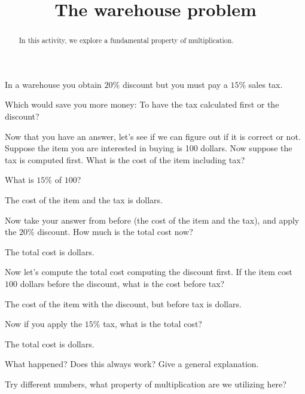 \documentclass{ximera}
\title{The warehouse problem}
\begin{document}
\begin{abstract}
In this activity, we explore a fundamental property of multiplication. 
\end{abstract}
\maketitle

\begin{question}
In a warehouse you obtain $20\%$ discount but you must pay a $15\%$
sales tax. 


 Which would save you more money: To have the tax calculated
  first or the discount?
\begin{solution}
\begin{multiple-choice}
\end{multiple-choice}
\end{solution}
Now that you have an answer, let's see if we can figure out if it is
correct or not. Suppose the item you are interested in buying is 100
dollars. Now suppose the tax is computed first. What is the cost of
the item including tax?
\begin{solution}
\begin{hint}
What is $15\%$ of $100$?  
\end{hint}
The cost of the item and the tax is
 dollars. 
\end{solution}
 Now take your answer from before (the cost of the item and the tax),
and apply the $20\%$ discount. How much is the total cost now?
\begin{solution}
The total cost is  dollars. 
\end{solution}
 Now let's compute the total cost computing the discount first. If the
item cost $100$ dollars before the discount, what is the cost before tax?
\begin{solution}
The cost of the item with the discount, but before tax is  dollars. 
\end{solution}
 Now if you apply the $15\%$ tax, what is the total cost?
\begin{solution}
The total cost is  dollars.
\end{solution} 
 What happened? Does this always work? Give a general explanation.
\begin{free-response}
Try different numbers, what property of multiplication are we
utilizing here?
\end{free-response}

\end{question}
\end{document}

